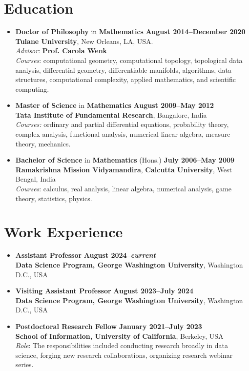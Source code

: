 \documentclass[11pt]{article}
\begin{document}
\section{Education}
\begin{itemize}[leftmargin=*]
\item \textbf{Doctor of Philosophy} in \textbf{Mathematics} 
  \hfill\textbf{\footnotesize August 2014--December 2020}\\
  \textbf{Tulane University}, New Orleans, LA, USA.\\
  \emph{Advisor}: \textbf{Prof. Carola Wenk} \\
  \emph{Courses}: computational geometry, computational topology,
  topological data analysis,  differential geometry, differentiable manifolds,
  algorithms, data structures, computational complexity, applied mathematics, and scientific computing.

\item  \textbf{Master of Science} in \textbf{Mathematics}
  \hfill\textbf{\footnotesize August 2009--May 2012}\\
  \textbf{Tata Institute of Fundamental Research}, Bangalore, India \\
  \emph{Courses:} ordinary and partial differential equations, probability
  theory, complex analysis, functional analysis, numerical linear algebra,
  measure theory, mechanics.
  
\item \textbf{Bachelor of Science} in \textbf{Mathematics} (Hons.)
  \hfill\textbf{\footnotesize July 2006--May 2009}\\
  \textbf{Ramakrishna Mission Vidyamandira}, \textbf{Calcutta University},
  West Bengal, India\\
  \emph{Courses}: calculus, real analysis, linear algebra, numerical analysis,
  game theory, statistics, physics.
\end{itemize}

\section{Work Experience}
\begin{itemize}[leftmargin=*]
\item \textbf{Assistant Professor} 
\hfill\textbf{\footnotesize August 2024--\emph{current}}\\
\textbf{Data Science Program, George Washington University}, Washington D.C., USA
\item \textbf{Visiting Assistant Professor} 
\hfill\textbf{\footnotesize August 2023--July 2024}\\
\textbf{Data Science Program, George Washington University}, Washington D.C., USA\\
\item \textbf{Postdoctoral Research Fellow} 
\hfill\textbf{\footnotesize January 2021--July 2023}\\
\textbf{School of Information, University of California}, Berkeley, USA\\
\textit{Role}: The responsibilities included conducting research broadly in data
science, forging new research collaborations, organizing research webinar
series.
\end{itemize}
\end{document}
